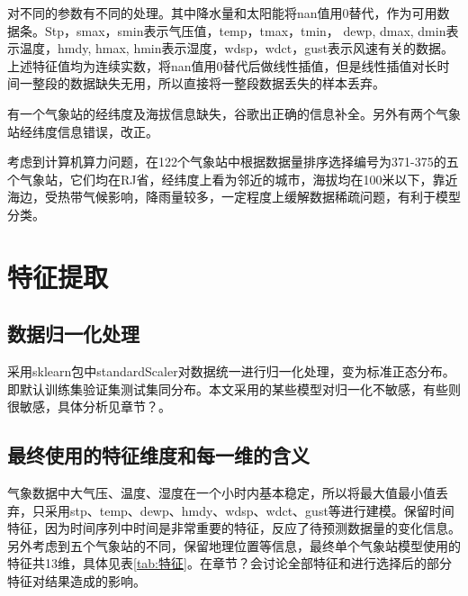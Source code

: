 \documentclass[UTF8]{ctexart}
\begin{document}
对不同的参数有不同的处理。其中降水量和太阳能将nan值用0替代，作为可用数据条。Stp，smax，smin表示气压值，temp，tmax，tmin， dewp, dmax, dmin表示温度，hmdy, hmax, hmin表示湿度，wdsp，wdct，gust表示风速有关的数据。上述特征值均为连续实数，将nan值用0替代后做线性插值，但是线性插值对长时间一整段的数据缺失无用，所以直接将一整段数据丢失的样本丢弃。

有一个气象站的经纬度及海拔信息缺失，谷歌出正确的信息补全。另外有两个气象站经纬度信息错误，改正。

考虑到计算机算力问题，在122个气象站中根据数据量排序选择编号为371-375的五个气象站，它们均在RJ省，经纬度上看为邻近的城市，海拔均在100米以下，靠近海边，受热带气候影响，降雨量较多，一定程度上缓解数据稀疏问题，有利于模型分类。


\section{特征提取}

\subsection{数据归一化处理}
采用sklearn包中standardScaler对数据统一进行归一化处理，变为标准正态分布。即默认训练集验证集测试集同分布。本文采用的某些模型对归一化不敏感，有些则很敏感，具体分析见章节？。

\subsection{最终使用的特征维度和每一维的含义}
气象数据中大气压、温度、湿度在一个小时内基本稳定，所以将最大值最小值丢弃，只采用stp、temp、dewp、hmdy、wdsp、wdct、gust等进行建模。保留时间特征，因为时间序列中时间是非常重要的特征，反应了待预测数据量的变化信息。另外考虑到五个气象站的不同，保留地理位置等信息，最终单个气象站模型使用的特征共13维，具体见表\ref{tab:特征}。在章节？会讨论全部特征和进行选择后的部分特征对结果造成的影响。
\end{document}
